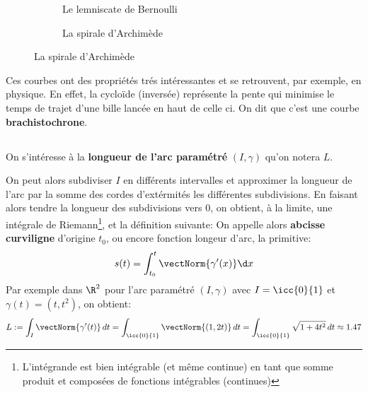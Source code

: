 \begin{figure}[h]
\begin{subfigure}{.3\textwidth}
      \caption*{Le lemniscate de Bernoulli}
   \end{subfigure}\quad
   \begin{subfigure}{.3\textwidth}
      \centering
      \caption*{La spirale d'Archimède}
   \end{subfigure}\quad
\end{figure}

Ces courbes ont des propriétés trés intéressantes et se retrouvent, par exemple, en physique. En effet, la cycloïde (inversée) représente la pente qui minimise le temps de trajet d'une bille lancée en haut de celle ci. On dit que c'est une courbe \textbf{brachistochrone}.

\subsection*{}
On s'intéresse à la \textbf{longueur de l'arc paramétré} \((I, \gamma)\) qu'on notera \(L\).\<

On peut alors subdiviser \(I\) en différents intervalles et approximer la longueur de l'arc par la somme des cordes d'extérmités les différentes subdivisions. En faisant alors tendre la longueur des subdivisions vers 0, on obtient, à la limite, une intégrale de Riemann\footnote[1]{L'intégrande est bien intégrable (et même continue) en tant que somme produit et composées de fonctions intégrables (continues)}, et la définition suivante:
On appelle alors \textbf{abcisse curviligne} d'origine \(t_0\), ou encore fonction longeur d'arc, la primitive:
\[
   s(t) = \int_{t_0}^{t} \vectNorm{\gamma'(x)} \d x
\]
Par exemple dans \(\R^2\) pour l'arc paramétré \((I, \gamma)\) avec \(I = \icc{0}{1}\) et \(\gamma(t) = (t, t^2)\), on obtient:
\[
   L := \int_{I} \vectNorm{\gamma'(t)}\,dt = \int_{\icc{0}{1}} \vectNorm{(1, 2t)}\,dt = \int_{\icc{0}{1}}\sqrt{1 + 4t^2}\,dt \approx 1.47
\]
\pagebreak

